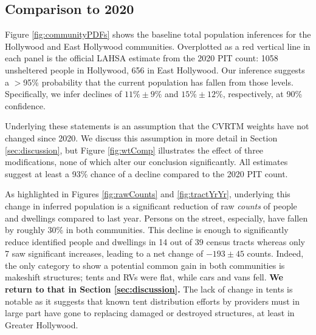 \documentclass[11pt,twocolumn]{article}
\def\bfr{\bf\color{red}}
\def\resp{respectively}
\begin{document}

\subsection{Comparison to 2020}
\label{sec:comp}

Figure \ref{fig:communityPDFs} shows the baseline total population inferences for the Hollywood
and East Hollywood communities. Overplotted as a red vertical line in each panel is the official LAHSA
estimate from the 2020 PIT count: 1058 unsheltered people in Hollywood, 656 in East Hollywood.
Our inference suggests a $>$95\% probability that the current population has fallen from those levels.
Specifically, we infer declines of $11\%\pm9\%$ and $15\%\pm12\%$, \resp, at 90\% confidence.

Underlying these statements is an assumption that the CVRTM weights have not changed since 2020.
We discuss this assumption in more detail in Section \ref{sec:discussion}, but Figure \ref{fig:wtComp}
illustrates the effect of three modifications, none of which alter our conclusion significantly. 
All estimates suggest at least a 93\% chance of a decline compared to the 2020 PIT count.

As highlighted in Figures \ref{fig:rawCounts} and \ref{fig:tractYrYr}, underlying this change in
inferred population is a significant reduction of raw {\it counts} of people and dwellings compared
to last year. Persons on the street, especially, have fallen by roughly 30\% in both communities. This
decline is enough to significantly reduce identified people and dwellings in 14 out of 39 census tracts 
whereas only 7 saw significant increases, leading to a net change of $-193\pm45$ counts. Indeed,
the only category to show a potential common gain in both communities is makeshift structures;
tents and RVs were flat, while cars and vans fell. {\bfr We return to that in Section \ref{sec:discussion}.}
The lack of change in tents is notable as it suggests that known tent distribution efforts by 
providers must in large part have gone to replacing damaged or destroyed structures, at least 
in Greater Hollywood.
\end{document}
